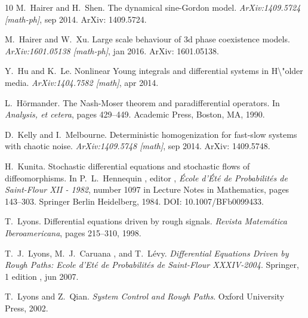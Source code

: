 \documentclass{amsart}
\newcommand{\tmtextit}[1]{{\itshape{#1}}}
\theoremstyle{remark}
\theoremstyle{definition}
\begin{document}
\begin{thebibliography}{10}
  M.~Hairer  and  H.~Shen.{\newblock} The
  dynamical sine-Gordon model.{\newblock} \tmtextit{ArXiv:1409.5724
  [math-ph]}, sep 2014.{\newblock} ArXiv: 1409.5724.{\newblock}
  
  M.~Hairer  and  W.~Xu.{\newblock} Large scale
  behaviour of 3d phase coexistence models.{\newblock}
  \tmtextit{ArXiv:1601.05138 [math-ph]}, jan 2016.{\newblock} ArXiv:
  1601.05138.{\newblock}
  
  Y.~Hu  and  K.~Le.{\newblock} Nonlinear Young
  integrals and differential systems in H\textbackslash "older
  media.{\newblock} \tmtextit{ArXiv:1404.7582 [math]}, apr 2014.{\newblock}
  
  L.~H{\"o}rmander.{\newblock} The
  Nash-Moser theorem and paradifferential operators.{\newblock} In
  \tmtextit{Analysis, et cetera},  pages  429--449. Academic Press, Boston,
  MA, 1990.{\newblock}
  
  D.~Kelly  and 
  I.~Melbourne.{\newblock} Deterministic homogenization for fast-slow systems
  with chaotic noise.{\newblock} \tmtextit{ArXiv:1409.5748 [math]}, sep
  2014.{\newblock} ArXiv: 1409.5748.{\newblock}
  
  H.~Kunita.{\newblock} Stochastic
  differential equations and stochastic flows of diffeomorphisms.{\newblock}
  In  P.~L.~Hennequin , editor , \tmtextit{{\'E}cole d'{\'E}t{\'e} de
  Probabilit{\'e}s de Saint-Flour XII - 1982},  number  1097  in  Lecture
  Notes in Mathematics,  pages  143--303. Springer Berlin Heidelberg,
  1984.{\newblock} DOI: 10.1007/BFb0099433.{\newblock}
  
  T.~Lyons.{\newblock} Differential
  equations driven by rough signals.{\newblock} \tmtextit{Revista
  Matem{\'a}tica Iberoamericana},  pages  215--310, 1998.{\newblock}
  
  T.~J.~Lyons, M.~J.~Caruana , and 
  T.~L{\'e}vy.{\newblock} \tmtextit{Differential Equations Driven by Rough
  Paths: Ecole d'Et{\'e} de Probabilit{\'e}s de Saint-Flour
  XXXIV-2004}.{\newblock} Springer, 1  edition , jun 2007.{\newblock}
  
  T.~Lyons  and  Z.~Qian.{\newblock}
  \tmtextit{System Control and Rough Paths}.{\newblock} Oxford University
  Press, 2002.{\newblock}
  

\end{thebibliography}
\end{document}
